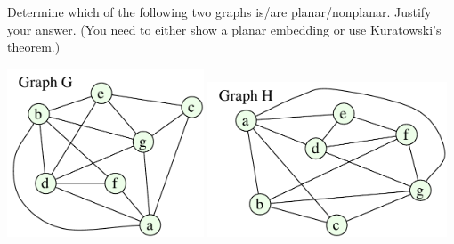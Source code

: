 \documentclass{article}
\begin{document}
\begin{problem}
Determine which of the following two graphs is/are planar/nonplanar.
Justify your answer. (You need to either show a planar embedding or
use Kuratowski's theorem.)

	\begin{center}
		\includegraphics[width = 2.3in]{HW5_pics/graphGa_hw5.pdf}
		\hfill
		\includegraphics[width = 2.8in]{HW5_pics/graphHa_hw5.pdf}
	\end{center}

\end{problem}
\end{document}
